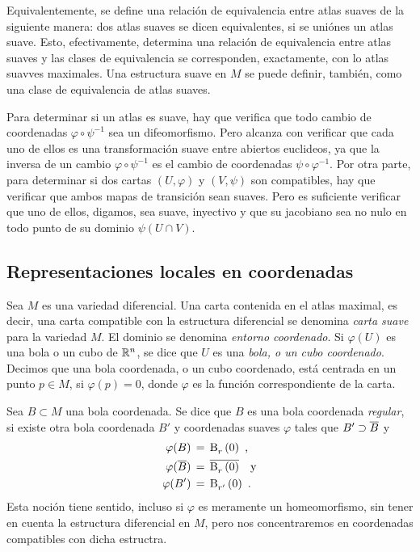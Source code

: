 \begin{remarkAtlasMax}\label{rem:atlasmax}
	Equivalentemente, se define una relaci\'{o}n de equivalencia entre
	atlas suaves de la siguiente manera: dos atlas suaves se dicen
	equivalentes, si se uni\'{o}nes un atlas suave. Esto, efectivamente,
	determina una relaci\'{o}n de equivalencia entre atlas suaves y
	las clases de equivalencia se corresponden, exactamente, con lo atlas
	suavves maximales. Una estructura suave en $M$ se puede definir,
	tambi\'{e}n, como una clase de equivalencia de atlas suaves.
\end{remarkAtlasMax}

Para determinar si un atlas es suave, hay que verifica que todo cambio de
coordenadas $\varphi\circ\psi^{-1}$ sea un difeomorfismo. Pero alcanza
con verificar que cada uno de ellos es una transformaci\'{o}n suave entre
abiertos euclideos, ya que la inversa de un cambio $\varphi\circ\psi^{-1}$
es el cambio de coordenadas $\psi\circ\varphi^{-1}$. Por otra parte, para
determinar si dos cartas $(U,\varphi)$ y $(V,\psi)$ son compatibles, hay
que verificar que ambos mapas de transici\'{o}n sean suaves. Pero es
suficiente verificar que uno de ellos, digamos, sea suave, inyectivo y que
su jacobiano sea no nulo en todo punto de su dominio $\psi(U\cap V)$.

\subsection{Representaciones locales en coordenadas}
Sea $M$ es una variedad diferencial. Una carta contenida en el atlas maximal,
es decir, una carta compatible con la estructura diferencial se denomina
\emph{carta suave} para la variedad $M$. El dominio se denomina \emph{entorno %
coordenado}. Si $\varphi(U)$ es una bola o un cubo de $\mathbb{R}^{n}$, se
dice que $U$ es una \emph{bola, o un cubo coordenado}. Decimos que una bola
coordenada, o un cubo coordenado, est\'{a} centrada en un punto $p\in M$,
si $\varphi(p)=0$, donde $\varphi$ es la funci\'{o}n correspondiente de
la carta.

Sea $B\subset M$ una bola coordenada. Se dice que $B$ es una bola coordenada
\emph{regular}, si existe otra bola coordenada $B'$ y coordenadas suaves
$\varphi$ tales que $B'\supset\overline{B}$ y
\begin{align*}
	\varphi(B) & \,=\,\mathrm{B}^{}_{r}\left(0\right)\text{ ,} \\
	\varphi(\overline{B}) & \,=\,\overline{\mathrm{B}^{}_{r}\left(0\right)}\quad\text{y} \\
	\varphi(B') & \,=\,\mathrm{B}^{}_{r'}\left(0\right)
	\text{ .}
\end{align*}
%
Esta noci\'{o}n tiene sentido, incluso si $\varphi$ es meramente un
homeomorfismo, sin tener en cuenta la estructura diferencial en $M$,
pero nos concentraremos en coordenadas compatibles con dicha estructra.

